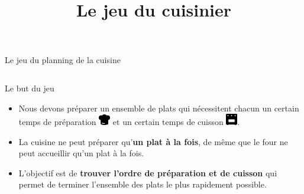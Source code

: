 \documentclass[landscape]{beamer}
\title{Le jeu du cuisinier}
\date{}
\begin{document}


\begin{frame}{Le jeu du planning de la cuisine}



\begin{columns}
\begin{column}{0.7\textwidth}

\begin{block}{Le but du jeu}

\begin{itemize}
\item Nous devons préparer un ensemble de plats qui nécessitent chacun un certain temps de préparation \includegraphics[width=0.5cm]{icons/toque.png} et un certain temps de cuisson \includegraphics[width=0.5cm]{icons/four.png}. 

\item
La cuisine ne peut préparer qu'\textbf{un plat à la fois}, de même que le four ne peut accueillir qu'un plat à la fois.

\item
L'objectif est de \textbf{trouver l'ordre de préparation et de cuisson} qui permet de terminer l'ensemble des plats le plus rapidement possible.
\end{itemize}

\end{block}
\end{column}


\end{columns}
\end{frame}
\end{document}
